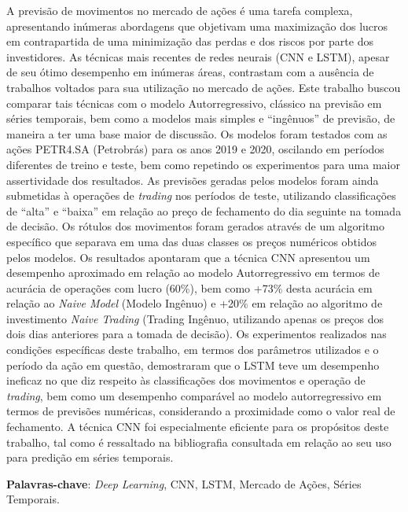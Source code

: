 \setlength{\absparsep}{18pt} %
\begin{resumo}
A previsão de movimentos no mercado de ações é uma tarefa complexa, apresentando inúmeras abordagens que objetivam uma maximização dos lucros em contrapartida de uma minimização das perdas e dos riscos por parte dos investidores. As técnicas mais recentes de redes neurais (CNN e LSTM), apesar de seu ótimo desempenho em inúmeras áreas, contrastam com a ausência de trabalhos voltados para sua utilização no mercado de ações. Este trabalho buscou comparar tais técnicas com o modelo Autorregressivo, clássico na previsão em séries temporais, bem como a modelos mais simples e ``ingênuos'' de previsão, de maneira a ter uma base maior de discussão. Os modelos foram testados com as ações PETR4.SA (Petrobrás) para os anos 2019 e 2020, oscilando em períodos diferentes de treino e teste, bem como repetindo os experimentos para uma maior assertividade dos resultados. As previsões geradas pelos modelos foram ainda submetidas à operações de \textit{trading} nos períodos de teste, utilizando classificações de ``alta'' e ``baixa'' em relação ao preço de fechamento do dia seguinte na tomada de decisão. Os rótulos dos movimentos foram gerados através de um algoritmo específico que separava em uma das duas classes os preços numéricos obtidos pelos modelos. Os resultados apontaram que a técnica CNN apresentou um desempenho aproximado em relação ao modelo Autorregressivo em termos de acurácia de operações com lucro (60\%), bem como +73\% desta acurácia em relação ao \textit{Naive Model} (Modelo Ingênuo) e +20\% em relação ao algoritmo de investimento \textit{Naive Trading} (Trading Ingênuo, utilizando apenas os preços dos dois dias anteriores para a tomada de decisão). Os experimentos realizados nas condições específicas deste trabalho, em termos dos parâmetros utilizados e o período da ação em questão, demostraram que o LSTM teve um desempenho ineficaz no que diz respeito às classificações dos movimentos e operação de \textit{trading}, bem como um desempenho comparável ao modelo autorregressivo em termos de previsões numéricas, considerando a proximidade como o valor real de fechamento. A técnica CNN foi especialmente eficiente para os propósitos deste trabalho, tal como é ressaltado na bibliografia consultada em relação ao seu uso para predição em séries temporais.

 \textbf{Palavras-chave}: \textit{Deep Learning}, CNN, LSTM, Mercado de Ações, Séries Temporais.
 
\end{resumo}